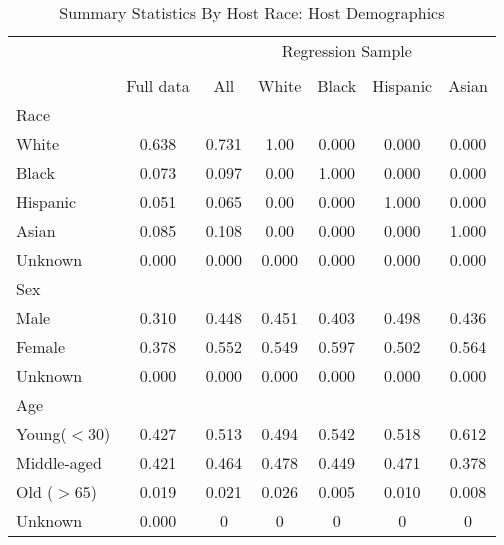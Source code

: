 \begin{table}[htbp]
\caption{Summary Statistics By Host Race: Host Demographics}
\begin{center}%
\small\begin{tabular}{l c | c | c c c c}
& \multicolumn{1}{c}{} & \multicolumn{5}{c}{Regression Sample}
\\
 \cmidrule(r){3-7}
\\
 & \multicolumn{1}{c}{Full data} & \multicolumn{1}{c}{All} & White & Black & Hispanic & Asian
\\
\hline\hline\noalign{\smallskip} 
 Race &&&&&& \\
 \hspace{10bp}White & 0.638 & 0.731 &  1.00 & 0.000 &  0.000 & 0.000 \\  \hspace{10bp}Black & 0.073 & 0.097 &  0.00 & 1.000 &  0.000 & 0.000 \\  \hspace{10bp}Hispanic & 0.051 & 0.065 &  0.00 & 0.000 &  1.000 & 0.000 \\  \hspace{10bp}Asian & 0.085 & 0.108 &  0.00 & 0.000 &  0.000 & 1.000 \\  \hspace{10bp}Unknown & 0.000 & {0.000} & {0.000} &  {0.000}  & {0.000}  & {0.000} \\  Sex &&&&&& \\
 \hspace{10bp}Male & 0.310 & 0.448 &  0.451 & 0.403 &  0.498 & 0.436 \\  \hspace{10bp}Female & 0.378 & 0.552 &  0.549 & 0.597 &  0.502 & 0.564 \\  \hspace{10bp}Unknown & 0.000 & {0.000} & {0.000} &  {0.000}  & {0.000}  & {0.000} \\  Age &&&&&& \\
 \hspace{10bp}Young($<30$) & 0.427 & 0.513 &  0.494 & 0.542 &  0.518 & 0.612 \\  \hspace{10bp}Middle-aged & 0.421 & 0.464 &  0.478 & 0.449 &  0.471 & 0.378 \\  \hspace{10bp}Old ($>65$) &               0.019 & 0.021 &  0.026 & 0.005 &  0.010 & 0.008 \\  \hspace{10bp}Unknown & 0.000 & {0} & {0} &  {0}  & {0}  & {0} \\ \hline

\end{tabular}
\end{center}
\end{table}

